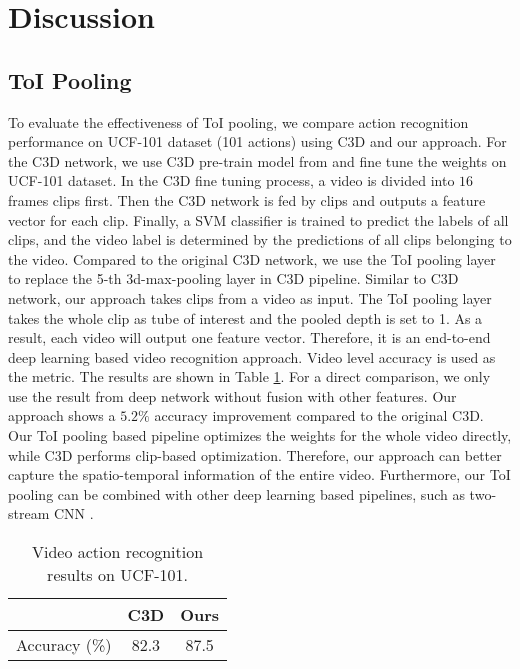 \documentclass[10pt,twocolumn,letterpaper]{article}
\begin{document}
\section{Discussion}
\label{sec:discussion}


\subsection{ToI Pooling}
\label{subsec:toipool}
To evaluate the effectiveness of ToI pooling, we compare action recognition performance on UCF-101 dataset (101 actions) using C3D \cite{c3d} and our approach. For the C3D network, we use C3D pre-train model from \cite{c3d} and fine tune the weights on UCF-101 dataset. In the C3D fine tuning process, a video is divided into $16$ frames clips first. Then the C3D network is fed by clips and outputs a feature vector for each clip. Finally, a SVM classifier is trained to predict the labels of all clips, and the video label is determined by the predictions of all clips belonging to the video. Compared to the original C3D network, we use the ToI pooling layer to replace the 5-th 3d-max-pooling layer in C3D pipeline.
Similar to C3D network, our approach takes clips from a video as input. The ToI pooling layer takes the whole clip as tube of interest and the pooled depth is set to 1. As a result, each video will output one feature vector. Therefore, it is an end-to-end deep learning based video recognition approach. Video level accuracy is used as the metric. The results are shown in Table \ref{tab:toi_eval}.
For a direct comparison, we only use the result from deep network without fusion with other features. Our approach shows a $5.2\%$ accuracy improvement compared to the original C3D. Our ToI pooling based pipeline optimizes the weights for the whole video directly, while C3D performs clip-based optimization. Therefore, our approach can better capture the spatio-temporal information of the entire video. Furthermore, our ToI pooling can be combined with other deep learning based pipelines, such as two-stream CNN \cite{2stream_cnn_simonyan_2014two}.

\begin{table}[!h]
\small
\begin{center}
\begin{tabular}{lcc}
\hline
                & C3D \cite{c3d}    & Ours \\
\hline
Accuracy (\%)   & 82.3              & 87.5 \\
\hline

\end{tabular}
\caption{Video action recognition results on UCF-101.}
\label{tab:toi_eval}
\end{center}
\end{table}
\end{document}
